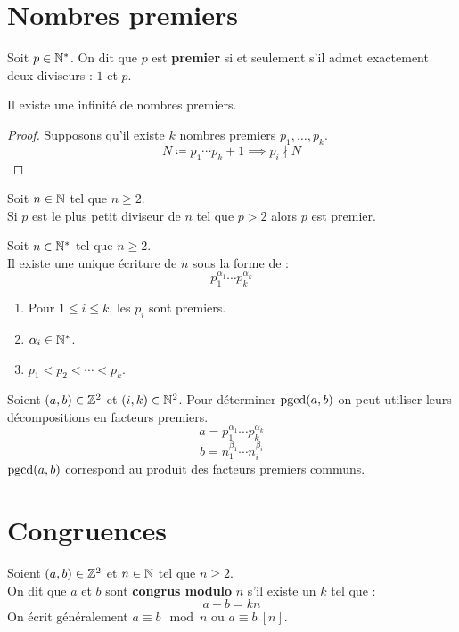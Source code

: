 \section{Nombres premiers}
\begin{definition}
	Soit $p \in \mathbb{N}^*$. On dit que $p$ est \textbf{premier} si et seulement s'il admet exactement deux diviseurs : $1$ et $p$.
\end{definition}

\begin{theorem}
	Il existe une infinité de nombres premiers.
\end{theorem}

\begin{proof}
	Supposons qu'il existe $k$ nombres premiers $p_1, \ldots, p_k$.
	\[ N \coloneqq p_1 \cdots p_k + 1 \implies p_i \nmid N \]
\end{proof}

\begin{lemma}
	Soit $n \in \mathbb{N}$ tel que $n \geq 2$.
	\\
	Si $p$ est le plus petit diviseur de $n$ tel que $p > 2$ alors $p$ est premier.
\end{lemma}

\begin{theorem}
	Soit $n \in \mathbb{N}^*$ tel que $n \geq 2$. 
	\\
	Il existe une unique écriture de $n$ sous la forme de :
	\[ p_1^{\alpha_1} \cdots p_k^{\alpha_k} \]
	\begin{enumerate}
		\item Pour $1 \leq i \leq k$, les $p_i$ sont premiers.
		\item $\alpha_i \in \mathbb{N}^*$.
		\item $p_1 < p_2 < \cdots < p_k$.
	\end{enumerate}
\end{theorem}

\begin{proposition}
	Soient $(a, b) \in \mathbb{Z}^2$ et $(i, k) \in \mathbb{N}^2$. Pour déterminer $\operatorname{pgcd}(a, b)$ on peut utiliser leurs décompositions en facteurs premiers.
	\[ a = p_1^{\alpha_1} \cdots p_k^{\alpha_k} \]
	\[ b = n_1^{\beta_1} \cdots n_i^{\beta_i} \]
	$\operatorname{pgcd}(a, b)$ correspond au produit des facteurs premiers communs.
\end{proposition}

\section{Congruences}
\begin{definition}
	Soient $(a,b) \in \mathbb{Z}^2$ et $n \in \mathbb{N}$ tel que $n \geq 2$.
	\\
	On dit que $a$ et $b$ sont \textbf{congrus modulo} $n$ s'il existe un $k$ tel que :
	\[ a - b = k n \]
	On écrit généralement $a \equiv b \mod n$ ou $a \equiv b \ [n]$.
\end{definition}

